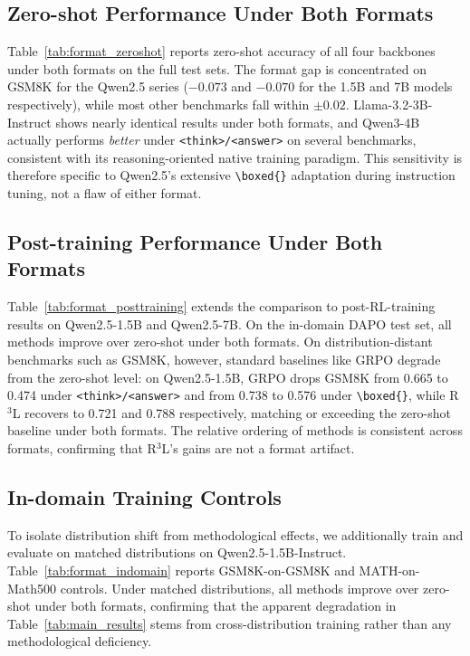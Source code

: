 \documentclass{article} %
\theoremstyle{definition}
\theoremstyle{remark}
\begin{document}
\subsection{Zero-shot Performance Under Both Formats}



Table~\ref{tab:format_zeroshot} reports zero-shot accuracy of all four backbones under both formats on the full test sets. The format gap is concentrated on GSM8K for the Qwen2.5 series ($-0.073$ and $-0.070$ for the 1.5B and 7B models respectively), while most other benchmarks fall within $\pm 0.02$. Llama-3.2-3B-Instruct shows nearly identical results under both formats, and Qwen3-4B actually performs \emph{better} under \texttt{<think>/<answer>} on several benchmarks, consistent with its reasoning-oriented native training paradigm. This sensitivity is therefore specific to Qwen2.5's extensive \texttt{\textbackslash boxed\{\}} adaptation during instruction tuning, not a flaw of either format.

\subsection{Post-training Performance Under Both Formats}



Table~\ref{tab:format_posttraining} extends the comparison to post-RL-training results on Qwen2.5-1.5B and Qwen2.5-7B. On the in-domain DAPO test set, all methods improve over zero-shot under both formats. On distribution-distant benchmarks such as GSM8K, however, standard baselines like GRPO degrade from the zero-shot level: on Qwen2.5-1.5B, GRPO drops GSM8K from 0.665 to 0.474 under \texttt{<think>/<answer>} and from 0.738 to 0.576 under \texttt{\textbackslash boxed\{\}}, while R$^3$L recovers to 0.721 and 0.788 respectively, matching or exceeding the zero-shot baseline under both formats. The relative ordering of methods is consistent across formats, confirming that R$^3$L's gains are not a format artifact.

\subsection{In-domain Training Controls}



To isolate distribution shift from methodological effects, we additionally train and evaluate on matched distributions on Qwen2.5-1.5B-Instruct. Table~\ref{tab:format_indomain} reports GSM8K-on-GSM8K and MATH-on-Math500 controls. Under matched distributions, all methods improve over zero-shot under both formats, confirming that the apparent degradation in Table~\ref{tab:main_results} stems from cross-distribution training rather than any methodological deficiency.
\end{document}
